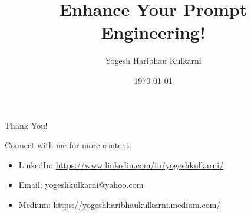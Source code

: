 \documentclass{beamer}
\title{Enhance Your Prompt Engineering!}
\author{Yogesh Haribhau Kulkarni}
\date{\today}
\begin{document}
\begin{frame}[plain]
\titlepage
\end{frame}



\begin{frame}[plain]
\vspace{1em}

{\centering
\Huge Thank You!}
\vspace{1em}



\bigskip
Connect with me for more content:
\begin{itemize}
  \item LinkedIn: \url{https://www.linkedin.com/in/yogeshkulkarni/}
  \item Email: yogeshkulkarni@yahoo.com
  \item Medium:  \url{https://yogeshharibhaukulkarni.medium.com/}
\end{itemize}
\end{frame}
\end{document}
